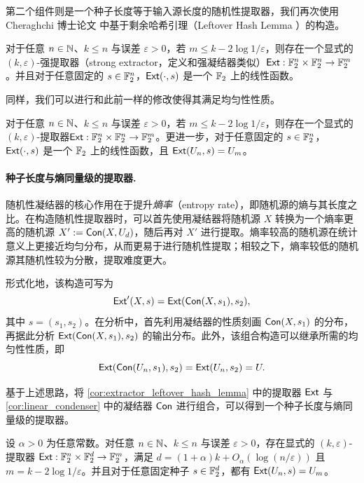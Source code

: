 第二个组件则是一个种子长度等于输入源长度的随机性提取器，我们再次使用 Cheraghchi 博士论文 \cite{Cheraghchi11_phd_thesis} 中基于剩余哈希引理（Leftover Hash Lemma \cite{ILL89_leftover_hash_lemma}）的构造。

\begin{lemma}\label{cor:extractor_leftover_hash_lemma_not_full_rank}
    对于任意 $n \in \mathbb{N}$、$k \le n$ 与误差 $\varepsilon > 0$，若 $m \le k - 2 \log 1 / \varepsilon$，则存在一个显式的 $(k, \varepsilon)$-强提取器（strong extractor，定义和强凝结器类似）$\mathsf{Ext} : \mathbb{F}_2^n \times \mathbb{F}_2^n \to \mathbb{F}_2^m$。并且对于任意固定的 $s \in \mathbb{F}_2^n$，$\mathsf{Ext}(\cdot, s)$ 是一个 $\mathbb{F}_2$ 上的线性函数。
\end{lemma}

同样，我们可以进行和此前一样的修改使得其满足均匀性性质。

\begin{corollary}\label{cor:extractor_leftover_hash_lemma}
    对于任意 $n \in \mathbb{N}$、$k \le n$ 与误差 $\varepsilon > 0$，若 $m \le k - 2 \log 1 / \varepsilon$，则存在一个显式的 $(k, \varepsilon)$-提取器$\mathsf{Ext} : \mathbb{F}_2^n \times \mathbb{F}_2^n \to \mathbb{F}_2^m$。更进一步，对于任意固定的 $s \in \mathbb{F}_2^n$，$\mathsf{Ext}(\cdot, s)$ 是一个 $\mathbb{F}_2$ 上的线性函数，且 $\mathsf{Ext}(U_n, s) = U_m$。
\end{corollary}

\paragraph{种子长度与熵同量级的提取器.}

随机性凝结器的核心作用在于提升\emph{熵率}（entropy rate），即随机源的熵与其长度之比。在构造随机性提取器时，可以首先使用凝结器将随机源 $X$ 转换为一个熵率更高的随机源 $X' := \mathsf{Con}(X, U_d)$，随后再对 $X'$ 进行提取。熵率较高的随机源在统计意义上更接近均匀分布，从而更易于进行随机性提取；相较之下，熵率较低的随机源其随机性较为分散，提取难度更大。

形式化地，该构造可写为
$$
\mathsf{Ext}'(X, s) = \mathsf{Ext}(\mathsf{Con}(X, s_1), s_2),
$$
其中 $s = (s_1, s_2)$。在分析中，首先利用凝结器的性质刻画 $\mathsf{Con}(X, s_1)$ 的分布，再据此分析 $\mathsf{Ext}(\mathsf{Con}(X, s_1), s_2)$ 的输出分布。此外，该组合构造可以继承所需的均匀性性质，即
$$
\mathsf{Ext}(\mathsf{Con}(U_n, s_1), s_2) = \mathsf{Ext}(U_n, s_2) = U.
$$

基于上述思路，将 \cref{cor:extractor_leftover_hash_lemma} 中的提取器 $\mathsf{Ext}$ 与 \cref{cor:linear_condenser} 中的凝结器 $\mathsf{Con}$ 进行组合，可以得到一个种子长度与熵同量级的提取器。

\begin{proposition}
    设 $\alpha>0$ 为任意常数。对任意 $n \in \mathbb{N}$、$k \le n$ 与误差 $\varepsilon > 0$，存在显式的 $(k, \varepsilon)$-提取器 $\mathsf{Ext}: \mathbb{F}_2^n \times \mathbb{F}_2^d \to \mathbb{F}_2^m$，满足 $d = (1 + \alpha) k + O_\alpha(\log (n / \varepsilon))$ 且 $m = k - 2 \log 1 / \varepsilon$。并且对于任意固定种子 $s \in \mathbb{F}_2^d$，都有 $\mathsf{Ext}(U_n, s) = U_m$。
\end{proposition}

